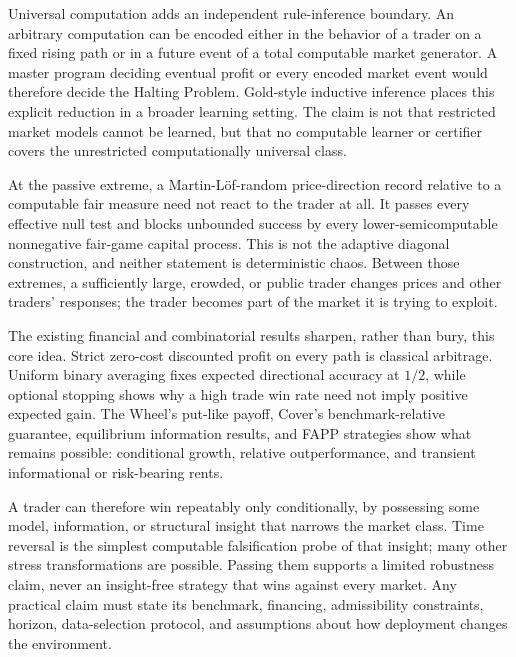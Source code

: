 \documentclass[aps,pra,reprint,superscriptaddress,amsmath,amssymb,floatfix]{revtex4-2}
\theoremstyle{plain}
\theoremstyle{definition}
\theoremstyle{remark}
\begin{document}
Universal computation adds an independent rule-inference boundary. An
arbitrary computation can be encoded either in the behavior of a trader on a
fixed rising path or in a future event of a total computable market generator.
A master program deciding eventual profit or every encoded market event would
therefore decide the Halting Problem. Gold-style inductive inference places
this explicit reduction in a broader learning setting. The claim is not that
restricted market models cannot be learned, but that no computable learner or
certifier covers the unrestricted computationally universal class.

At the passive extreme, a Martin-L\"of-random price-direction record relative
to a computable fair measure need not react to the trader at all. It passes
every effective null test and blocks unbounded success by every
lower-semicomputable nonnegative fair-game capital process. This is not the
adaptive diagonal construction, and neither statement is deterministic chaos.
Between those extremes, a sufficiently large, crowded, or public trader
changes prices and other traders' responses; the trader becomes part of the
market it is trying to exploit.

The existing financial and combinatorial results sharpen, rather than bury,
this core idea. Strict zero-cost discounted profit on every path is classical
arbitrage. Uniform binary averaging fixes expected directional accuracy at
\(1/2\), while optional stopping shows why a high trade win rate need not
imply positive expected gain. The Wheel's put-like payoff, Cover's
benchmark-relative guarantee, equilibrium information results, and FAPP
strategies show what remains possible: conditional growth, relative
outperformance, and transient informational or risk-bearing rents.

A trader can therefore win repeatably only conditionally, by possessing some
model, information, or structural insight that narrows the market class.
Time reversal is the simplest computable falsification probe of that insight;
many other stress transformations are possible. Passing them supports a
limited robustness claim, never an insight-free strategy that wins against
every market. Any practical claim must state its benchmark, financing,
admissibility constraints, horizon, data-selection protocol, and assumptions
about how deployment changes the environment.
\end{document}
